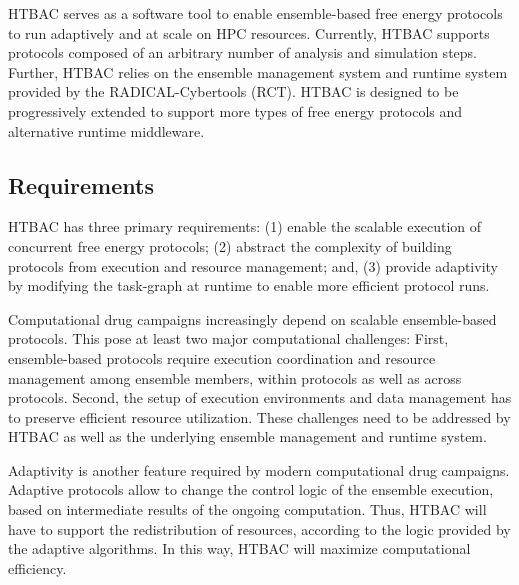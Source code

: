 HTBAC serves as a software tool to enable ensemble-based free energy
protocols to run adaptively and at scale on HPC resources. Currently, HTBAC
supports protocols composed of an arbitrary number of analysis and simulation
steps. Further, HTBAC relies on the ensemble management system and runtime
system provided by the RADICAL-Cybertools (RCT). HTBAC is designed to be
progressively extended to support more types of free energy protocols and
alternative runtime middleware.





\subsection{Requirements}

HTBAC has three primary requirements: (1) enable the scalable execution of
concurrent free energy protocols; (2) abstract the complexity of building
protocols from execution and resource management; and, (3) provide adaptivity
by modifying the task-graph at runtime to enable more efficient protocol
runs.

Computational drug campaigns increasingly depend on scalable ensemble-based
protocols. This pose at least two major computational challenges: First,
ensemble-based protocols require execution coordination and resource
management among ensemble members, within protocols as well as across
protocols. Second, the setup of execution environments and data management
has to preserve efficient resource utilization. These challenges need to be
addressed by HTBAC as well as the underlying ensemble management and runtime
system.

Adaptivity is another feature required by modern computational drug
campaigns. Adaptive protocols allow to change the control logic of the
ensemble execution, based on intermediate results of the ongoing computation.
Thus, HTBAC will have to support the redistribution of resources, according
to the logic provided by the adaptive algorithms. In this way, HTBAC will
maximize computational efficiency.


